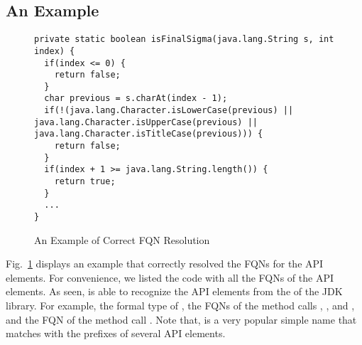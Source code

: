 \subsection{An Example}

\begin{figure}[t]
	\centering
\begin{lstlisting}[]
private static boolean isFinalSigma(java.lang.String s, int index) {
  if(index <= 0) {
    return false;
  }
  char previous = s.charAt(index - 1);
  if(!(java.lang.Character.isLowerCase(previous) || java.lang.Character.isUpperCase(previous) || java.lang.Character.isTitleCase(previous))) {
    return false;
  }
  if(index + 1 >= java.lang.String.length()) {
    return true;
  }
  ...
}
\end{lstlisting}
        \vspace{-12pt}
        \caption{An Example of Correct FQN Resolution}
        \label{fig:ex1}
\end{figure}

Fig.~\ref{fig:ex1} displays an example that {\tool} correctly resolved
the FQNs for the API elements. For convenience, we listed the code
with all the FQNs of the API elements. As seen, {\tool} is able to
recognize the API elements from the  of the JDK
library. For example, the formal type  of , the
FQNs of the method calls , , and
, and the FQN of the method call .
Note that,  is a very popular simple name that matches
with the prefixes of several API elements.
